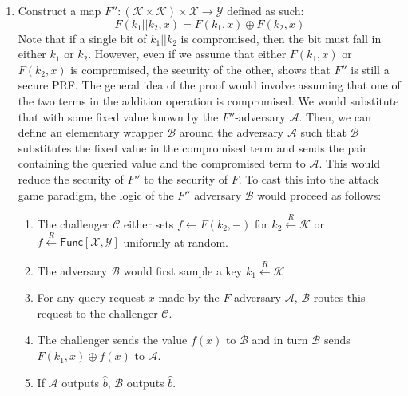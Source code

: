 \documentclass[11pt]{article}
\begin{document}
\begin{enumerate}
  \item Construct a map $F'': (\mathcal{K} \times \mathcal{K}) \times \mathcal{X} \rightarrow \mathcal{Y}$ defined as such:
  \[ F(k_1||k_2, x) =  F(k_1, x) \oplus F(k_2, x)\]
  Note that if a single bit of $k_1 || k_2$ is compromised, then the bit must fall in either $k_1$ or $k_2$. However, even if we assume that either $F(k_1, x)$ or $F(k_2, x)$ is compromised, the security of the other, shows that $F''$ is still a secure PRF. The general idea of the proof would involve assuming that one of the two terms in the addition operation is compromised. We would substitute that with some fixed value known by the $F''$-adversary $\mathcal{A}$. Then, we can define an elementary wrapper $\mathcal{B}$ around the adversary $\mathcal{A}$ such that $\mathcal{B}$ substitutes the fixed value in the compromised term and sends the pair containing the queried value and the compromised term to $\mathcal{A}$. This would reduce the security of $F''$ to the security of $F$. To cast this into the attack game paradigm, the logic of the $F''$ adversary $\mathcal{B}$ would proceed as follows:
  \begin{enumerate}
    \item The  challenger $\mathcal{C}$ either sets $f \leftarrow F(k_2,-)$ for $k_2 \xleftarrow{R} \mathcal{K}$ or $f \xleftarrow{R} \mathsf{Func}[\mathcal{X},\mathcal{Y}]$ uniformly at random.
    \item The adversary $\mathcal{B}$ would first sample a key $k_1 \xleftarrow{R} \mathcal{K}$
    \item For any query request $x$ made by the $F$ adversary $\mathcal{A}$, $\mathcal{B}$ routes this request to the challenger $\mathcal{C}$.
    \item The challenger sends the value $f(x)$ to $\mathcal{B}$ and in turn $\mathcal{B}$ sends $F(k_1,x)\oplus f(x)$ to $\mathcal{A}$.
    \item If $\mathcal{A}$ outputs $\hat{b}$, $\mathcal{B}$ outputs $\hat{b}$.
  \end{enumerate}
\end{enumerate}
\end{document}
